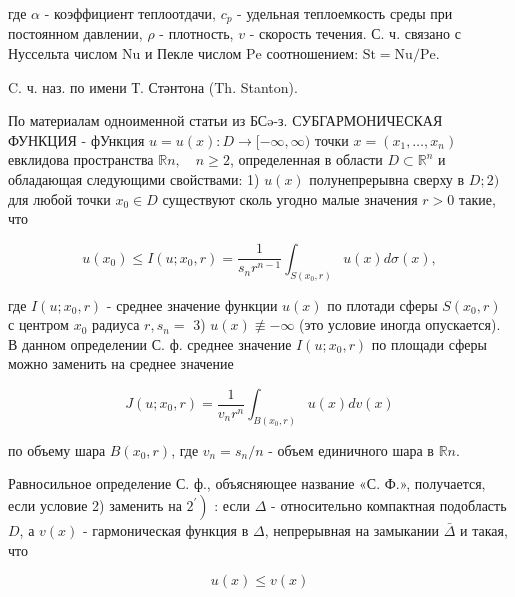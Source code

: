 \documentclass[10pt]{article}
\begin{document}
где $\alpha$ - коэффициент теплоотдачи, $c_{p}$ - удельная теплоемкость среды при постоянном давлении, $\rho$ - плотность, $v$ - скорость течения. С. ч. связано с Нуссельта числом $\mathrm{Nu}$ и Пекле числом $\mathrm{Pe}$ соотношением: $\mathrm{St}=\mathrm{Nu} / \mathrm{Pe}$.



C. ч. наз. по имени Т. Стәнтона (Th. Stanton).



По материалам одноименной статьи из БСə-з. СУБГАРМОНИЧЕСКАЯ ФУНКЦИЯ - фУнкция $u=u(x): D \rightarrow[-\infty, \infty)$ точки $x=\left(x_{1}, \ldots, x_{n}\right)$ евклидова пространства $\mathbb{R} n, \quad n \geqslant 2$, определенная в области $D \subset \mathbb{R}^{n}$ и обладающая следующими свойствами: 1) $u(x)$ полунепрерывна сверху в $D ; 2)$ для любой точки $x_{0} \in D$ существуют сколь угодно малые значения $r>0$ такие, что



\[

u\left(x_{0}\right) \leqslant I\left(u ; x_{0}, r\right)=\frac{1}{s_{n} r^{n-1}} \int_{S\left(x_{0}, r\right)} u(x) d \sigma(x),

\]



где $I\left(u ; x_{0}, r\right)$ - среднее значение функции $u(x)$ по плотади сферы $S\left(x_{0}, r\right)$ с центром $x_{0}$ радиуса $r, s_{n}=$ 3) $u(x) \not \equiv-\infty$ (это условие иногда опускается). В данном определении С. ф. среднее значение $I\left(u ; x_{0}, r\right)$ по площади сферы можно заменить на среднее значение



\[

J\left(u ; x_{0}, r\right)=\frac{1}{v_{n} r^{n}} \int_{B\left(x_{0}, r\right)} u(x) d v(x)

\]



по объему шара $B\left(x_{0}, r\right)$, где $v_{n}=s_{n} / n$ - объем единичного шара в $\mathbb{R} n$.



Равносильное определение С. ф., объясняющее название «С. Ф.», получается, если условие 2) заменить на $\left.2^{\prime}\right)$ : если $\Delta$ - относительно компактная подобласть $D$, а $v(x)$ - гармоническая функция в $\Delta$, непрерывная на замыкании $\bar{\Delta}$ и такая, что



\[

u(x) \leqslant v(x)

\]
\end{document}
